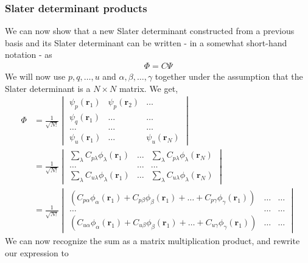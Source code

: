 \documentclass[11pt]{article}
\begin{document}
\subsubsection{Slater determinant products}
We can now show that a new Slater determinant constructed from a previous basis and its Slater determinant can be written - in a somewhat short-hand notation - as
\begin{align}
	\Phi = C \Psi
	\label{eq:slater-det-products}
\end{align}
We will now use $p,q,\dots,u$ and $\alpha,\beta,\dots,\gamma$ together under the assumption that the Slater determinant is a $N\times N$ matrix. We get,
\begin{align*}
	\Phi &= \frac{1}{\sqrt{N!}}
	\begin{vmatrix}
		\psi_p(\mathbf{r}_1) & \psi_p(\mathbf{r}_2) & \dots \\
		\psi_q(\mathbf{r}_1) & \dots 				& \dots	\\
		\dots 				 & \dots 				& \dots \\
		\psi_u(\mathbf{r}_1) & \dots 				& \psi_u(\mathbf{r}_N)
	\end{vmatrix} \\
	&= \frac{1}{\sqrt{N!}}
	\begin{vmatrix}
		\sum_\lambda C_{p\lambda} \phi_\lambda(\mathbf{r}_1) & \dots  & \sum_\lambda C_{p\lambda} \phi_\lambda(\mathbf{r}_N) \\
		\dots 				 								 & \dots  & \dots \\
		\sum_\lambda C_{u\lambda} \phi_\lambda(\mathbf{r}_1) & \dots  & \sum_\lambda C_{u\lambda} \phi_\lambda(\mathbf{r}_N)
	\end{vmatrix} \\
	&= \frac{1}{\sqrt{N!}}
	\begin{vmatrix}
		\left(C_{p\alpha} \phi_\alpha(\mathbf{r}_1) + C_{p\beta} \phi_\beta(\mathbf{r}_1) + \dots + C_{p\gamma} \phi_\gamma(\mathbf{r}_1)\right) & \dots  & \dots \\
		\dots 				 								 & \dots  & \dots \\
		\left(C_{u\alpha} \phi_\alpha(\mathbf{r}_1) + C_{u\beta} \phi_\beta(\mathbf{r}_1) + \dots + C_{u\gamma} \phi_\gamma(\mathbf{r}_1)\right) & \dots  & \dots
	\end{vmatrix}
\end{align*}
We can now recognize the sum as a matrix multiplication product, and rewrite our expression to
\end{document}
